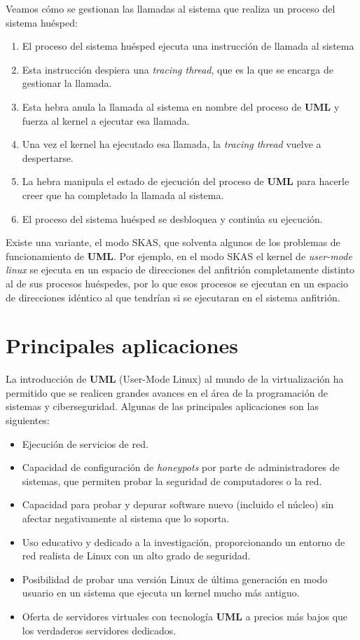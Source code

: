 \documentclass[11pt,twoside,titlepage,a4paper]{article}
\theoremstyle{definition}
\theoremstyle{plain_rojo}
\theoremstyle{remark}
\begin{document}
Veamos cómo se gestionan las llamadas al sistema que realiza un proceso del
sistema huésped:
\begin{enumerate}[font={\color{rojooscuro}\bfseries}]
\item El proceso del sistema huésped ejecuta una instrucción de llamada al
sistema
\item Esta instrucción despiera una \textit{tracing thread}, que es la que
se encarga de gestionar la llamada.
\item Esta hebra anula la llamada al sistema en nombre del proceso de 
\textbf{UML} y fuerza al kernel a ejecutar esa llamada.
\item Una vez el kernel ha ejecutado esa llamada, la \textit{tracing thread}
vuelve a despertarse.
\item La hebra manipula el estado de ejecución del proceso de \textbf{UML}
para hacerle creer que ha completado la llamada al sistema.
\item El proceso del sistema huésped se desbloquea y continúa su ejecución.
\end{enumerate}

Existe una variante, el modo SKAS, que solventa algunos de los problemas de
funcionamiento de \textbf{UML}. Por ejemplo, en el modo SKAS el kernel de
\textit{user-mode linux} se ejecuta en un espacio de direcciones del
anfitrión completamente distinto al de sus procesos huéspedes, por lo que
esos procesos se ejecutan en un espacio de direcciones idéntico al que 
tendrían si se ejecutaran en el sistema anfitrión.

\section{Principales aplicaciones}

La introducción de \textbf{UML} (User-Mode Linux) al mundo de la 
virtualización ha permitido que se realicen grandes avances en el área de la 
programación de sistemas y ciberseguridad. Algunas de las principales 
aplicaciones son las siguientes:
\begin{itemize}[font={\color{rojooscuro}\bfseries}]
\item Ejecución de servicios de red.
\item Capacidad de configuración de \textit{honeypots} por parte de 
administradores de sistemas, que permiten probar la seguridad de computadores 
o la red.
\item Capacidad para probar y depurar software nuevo (incluido el núcleo) sin 
afectar negativamente al sistema que lo soporta.
\item Uso educativo y dedicado a la investigación, proporcionando un entorno 
de red realista de Linux con un alto grado de seguridad.
\item Posibilidad de probar una versión Linux de última generación en modo 
usuario en un sistema que ejecuta un kernel mucho más antiguo.
\item Oferta de servidores virtuales con tecnología \textbf{UML} a precios 
más bajos que los verdaderos servidores dedicados.
\end{itemize}
\end{document}
